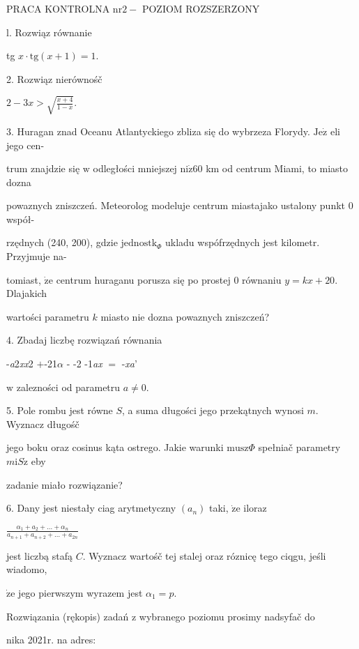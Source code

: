 \documentclass[a4paper,12pt]{article}
\begin{document}
PRACA KONTROLNA $\mathrm{n}\mathrm{r} 2-$ POZIOM ROZSZERZONY

l. Rozwiąz równanie

tg $x\cdot \mathrm{t}\mathrm{g}(x+1)=1.$

2. Rozwiąz nierównośč

$2-3x>\sqrt{\frac{x+4}{1-x}}.$

3. Huragan znad Oceanu Atlantyckiego zbliza się do wybrzeza Florydy. $\mathrm{J}\mathrm{e}\dot{\mathrm{z}}$ eli jego cen-

trum znajdzie się $\mathrm{w}$ odległości mniejszej $\mathrm{n}\mathrm{i}\dot{\mathrm{z}}60$ km od centrum Miami, to miasto dozna

powaznych zniszczeń. Meteorolog modeluje centrum miastajako ustalony punkt $0$ współ-

rzędnych (240, 200), gdzie $\mathrm{j}\mathrm{e}\mathrm{d}\mathrm{n}\mathrm{o}\mathrm{s}\mathrm{t}\mathrm{k}_{\Phi}$ ukladu wspófrzędnych jest kilometr. Przyjmuje na-

tomiast, $\dot{\mathrm{z}}\mathrm{e}$ centrum huraganu porusza się po prostej $0$ równaniu $y=kx+20$. Dlajakich

wartości parametru $k$ miasto nie dozna powaznych zniszczeń?

4. Zbadaj liczbę rozwiązań równania

-{\it a}2{\it xx}2 $+$-21$\alpha$ - -2 -1{\it ax} $=$ -{\it xa}'

$\mathrm{w}$ zalezności od parametru $a\neq 0.$

5. Pole rombu jest równe $S$, a suma długości jego przekątnych wynosi $m$. Wyznacz długośč

jego boku oraz cosinus kąta ostrego. Jakie warunki $\mathrm{m}\mathrm{u}\mathrm{s}\mathrm{z}\Phi$ spełniač parametry $m\mathrm{i}S\dot{\mathrm{z}}$ eby

zadanie miało rozwiązanie?

6. Dany jest niestały ciag arytmetyczny $(a_{n})$ taki, $\dot{\mathrm{z}}\mathrm{e}$ iloraz

$\displaystyle \frac{\alpha_{1}+a_{2}+\ldots+\alpha_{n}}{a_{n+1}+a_{n+2}+\ldots+a_{2n}}$

jest liczbą stafą $C$. Wyznacz wartośč tej stalej oraz róznicę tego ciqgu, jeśli wiadomo,

$\dot{\mathrm{z}}\mathrm{e}$ jego pierwszym wyrazem jest $\alpha_{1}=p.$

Rozwiązania (rękopis) zadań z wybranego poziomu prosimy nadsyfač do

nika 2021r. na adres:
\end{document}
